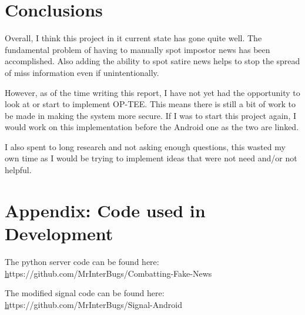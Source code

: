 \documentclass[a4paper, 11pt]{article}
\begin{document}
\section{Conclusions}
Overall, I think this project in it current state has gone quite well. The fundamental problem of having to manually spot impostor news has been accomplished. Also adding the ability to spot satire news helps to stop the spread of miss information even if unintentionally.

However, as of the time writing this report, I have not yet had the opportunity to look at or start to implement OP-TEE. This means there is still a bit of work to be made in making the system more secure. If I was to start this project again, I would work on this implementation before the Android one as the two are linked.

I also spent to long research and not asking enough questions, this wasted my own time as I would be trying to implement ideas that were not need and/or not helpful.
\newpage
\section{Appendix: Code used in Development}
The python server code can be found here: \href{https://github.com/MrInterBugs/Combatting-Fake-News}https://github.com/MrInterBugs/Combatting-Fake-News

The modified signal code can be found here: \href{https://github.com/MrInterBugs/Signal-Android}https://github.com/MrInterBugs/Signal-Android

\end{document}
